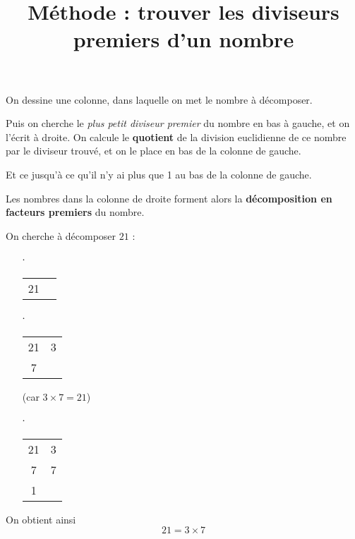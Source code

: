 \documentclass[a4paper]{article}
\title{Méthode : trouver les diviseurs premiers d'un nombre}
\date{}
\begin{document}
\maketitle

\begin{methode}
	On dessine une colonne, dans laquelle on met le nombre à décomposer.

	Puis on cherche le \textit{plus petit diviseur premier} du nombre en bas à gauche, et on l'écrit à droite. On calcule le \textbf{quotient} de la division euclidienne de ce nombre par le diviseur trouvé, et on le place en bas de la colonne de gauche.

	Et ce jusqu'à ce qu'il n'y ai plus que 1 au bas de la colonne de gauche.

	Les nombres dans la colonne de droite forment alors la \textbf{décomposition en facteurs premiers} du nombre.
\end{methode}

\begin{exemple}
	On cherche à décomposer $21$ :
	\begin{itemize}
		\setlength\itemsep{0.4em}
		\item[∙] \begin{tabular}{c|c}
			      21 &
		      \end{tabular}
		\item[∙] \begin{tabular}{c|c}
			      21 & 3 \\
			      7  &
		      \end{tabular} (car $3 × 7 = 21$)
		\item[∙] \begin{tabular}{c|c}
			      21 & 3 \\
			      7  & 7 \\
			      1  &
		      \end{tabular}
	\end{itemize}

	On obtient ainsi $$ 21 = 3 × 7 $$
\end{exemple}
\end{document}
